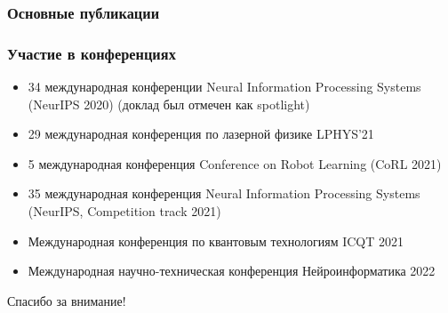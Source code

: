 \begin{frame} %
    \frametitle{Основные публикации}
    \nocite{vakbib1}%
    \nocite{vakbib2}%
    \nocite{wosbib1}%
    \nocite{scbib1}%
    \nocite{confbib1}%
    \nocite{confbib2}%
    \nocite{confbib3}%
    \nocite{confbib4}%
    \nocite{bib1}%
    \nocite{bib2}%
\end{frame}

\begin{frame}
    \frametitle{Участие в конференциях}
    \begin{itemize}
        \item 34 международная конференции Neural Information Processing Systems (NeurIPS 2020) (доклад был отмечен как spotlight)
        \item 29 международная конференция по лазерной физике LPHYS’21
        \item 5 международная конференция Conference on Robot Learning (CoRL 2021)
        \item  35 международная конференция Neural Information Processing Systems (NeurIPS, Competition track 2021)
        \item Международная конференция по квантовым технологиям ICQT 2021
        \item Международная научно-техническая конференция Нейроинформатика 2022
    \end{itemize}
\end{frame}

\begin{frame} %
    \begin{center}
        \Huge
        Спасибо за внимание!
    \end{center}
\end{frame}

